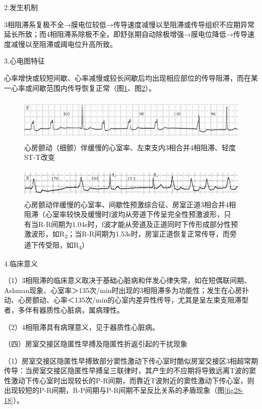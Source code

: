 2.发生机制

3相阻滞系复极不全→膜电位较低→传导速度减慢以至阻滞或传导组织不应期异常延长所致；而4相阻滞系除极不全，即舒张期自动除极增强→膜电位降低→传导速度减慢以至阻滞或阈电位升高所致。

3.心电图特征

心率增快或较短间歇、心率减慢或较长间歇后均出现相应部位的传导阻滞，而在某一心率或间歇范围内传导恢复正常（图\ref{fig28-16}、图\ref{fig28-17}）。

\begin{figure}[!htbp]
 \centering
 \includegraphics[width=5.60417in,height=0.83333in]{./images/Image00477.jpg}
 \captionsetup{justification=centering}
 \caption{心房颤动（细颤）伴缓慢的心室率、左束支内3相合并4相阻滞、轻度ST-T改变}
 \label{fig28-16}
  \end{figure} 

\begin{figure}[!htbp]
 \centering
 \includegraphics[width=5.60417in,height=0.57292in]{./images/Image00478.jpg}
 \captionsetup{justification=centering}
 \caption{心房颤动伴缓慢的心室率、间歇性预激综合征、房室正道3相合并4相阻滞（心室率较快及缓慢时f波均从旁道下传呈完全性预激波形，只有当R-R间期为1.04s时，f波才能从旁道及正道同时下传形成部分性预激波形，如R\textsubscript{3}；当R-R间期为1.53s时，房室正道恢复正常传导，而旁道下传受阻，如R\textsubscript{4}）}
 \label{fig28-17}
  \end{figure} 


4.临床意义

（1）3相阻滞的临床意义取决于基础心脏病和伴发心律失常，如在短偶联间期、Ashman现象、心室率＞135次/min时出现的3相阻滞多为功能性；发生在心房扑动、心房颤动、心率＜135次/min的心室内差异性传导，尤其是呈左束支阻滞型者，多伴有器质性心脏病，属病理性。

（2）4相阻滞具有病理意义，见于器质性心脏病。

（四）房室交接区隐匿性早搏及隐匿性折返引起的干扰现象

（1）房室交接区隐匿性早搏致部分窦性激动下传心室时酷似房室交接区3相超常期传导：当房室交接区隐匿性早搏呈三联律时，其产生的不应期将导致远离T波的窦性激动下传心室时出现较长的P-R间期，而靠近T波附近的窦性激动下传心室，则出现较短的P-R间期，R-P间期与P-R间期不呈反比关系的矛盾现象（图\ref{fig28-18}）。

